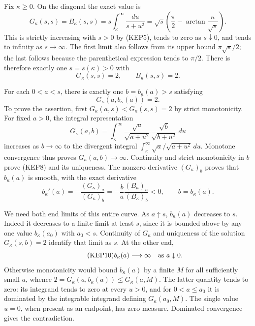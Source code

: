 \documentclass[11pt,a4paper]{article}
\begin{document}
Fix $\kappa\geq0$. On the diagonal the exact value is
\begin{equation}\tag{KEP6}
 G_\kappa(s,s)=B_\kappa(s,s)
 =s\int_\kappa^\infty\frac{du}{s+u^2}
 =\sqrt{s}\left(\frac\pi2-\arctan\frac \kappa{\sqrt{s}}\right).
\end{equation}
This is strictly increasing with $s>0$ by (KEP5), tends to zero as
$s\downarrow0$, and tends to infinity as $s\to\infty$. The first limit
also follows from its upper bound $\pi\sqrt{s}/2$; the last follows
because the parenthetical expression tends to $\pi/2$. There is therefore
exactly one $s=s(\kappa)>0$ with
\begin{equation}\tag{KEP7}
 G_\kappa(s,s)=2,
 \qquad B_\kappa(s,s)=2.
\end{equation}

For each $0<a<s$, there is exactly one $b=b_\kappa(a)>s$ satisfying
\begin{equation}\tag{KEP8}
 G_\kappa(a,b_\kappa(a))=2.
\end{equation}
To prove the assertion, first $G_\kappa(a,s)<G_\kappa(s,s)=2$ by strict
monotonicity. For fixed $a>0$, the integral representation
\[
 G_\kappa(a,b)=\int_\kappa^\infty
  \frac{\sqrt a}{\sqrt{a+u^2}}
  \frac{\sqrt b}{\sqrt{b+u^2}}\,du
\]
increases as $b\to\infty$ to the divergent integral
$\int_\kappa^\infty\sqrt a/\sqrt{a+u^2}\,du$.
Monotone convergence thus proves $G_\kappa(a,b)\to\infty$.
Continuity and strict monotonicity in $b$ prove (KEP8) and its uniqueness.
The nonzero derivative $(G_\kappa)_b$ proves that $b_\kappa(a)$ is smooth, with
the exact derivative
\begin{equation}\tag{KEP9}
 b_\kappa'(a)=-\frac{(G_\kappa)_a}{(G_\kappa)_b}
        =-\frac ba\frac{(B_\kappa)_a}{(B_\kappa)_b}<0,
 \qquad b=b_\kappa(a).
\end{equation}

We need both end limits of this entire curve. As $a\uparrow s$,
$b_\kappa(a)$ decreases to $s$. Indeed it decreases to a finite limit at
least $s$, since it is bounded above by any one value $b_\kappa(a_0)$ with
$a_0<s$. Continuity of $G_\kappa$ and uniqueness of the solution
$G_\kappa(s,b)=2$ identify that limit as $s$. At the other end,
\begin{equation}\tag{KEP10}
 b_\kappa(a)\longrightarrow\infty\quad\hbox{as }a\downarrow0.
\end{equation}
Otherwise monotonicity would bound $b_\kappa(a)$ by a finite $M$ for all
sufficiently small $a$, whence $2=G_\kappa(a,b_\kappa(a))\leq G_\kappa(a,M)$.
The latter quantity tends to zero: its integrand tends to zero at
every $u>0$, and for $0<a\leq a_0$ it is dominated by the integrable
integrand defining $G_\kappa(a_0,M)$. The single value $u=0$, when present
as an endpoint, has zero measure. Dominated convergence gives the
contradiction.
\end{document}
